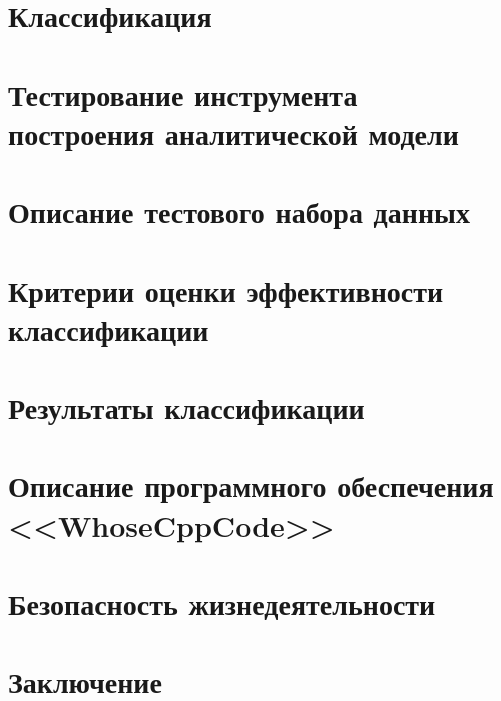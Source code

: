  
\newpage  
\section{Классификация}\label{classifiers}


\newpage
\section{Тестирование инструмента построения аналитической модели}\label{crossval}


\newpage 
\section{Описание тестового набора данных}\label{test_data}

\clearpage
\section{Критерии оценки эффективности классификации}\label{eval}

\newpage
\section{Результаты классификации}


\newpage
\section{Описание программного обеспечения <<WhoseCppCode>>}


% 

\clearpage
{}



\newpage
\section{Безопасность жизнедеятельности}

 
\newpage
\section*{Заключение}


